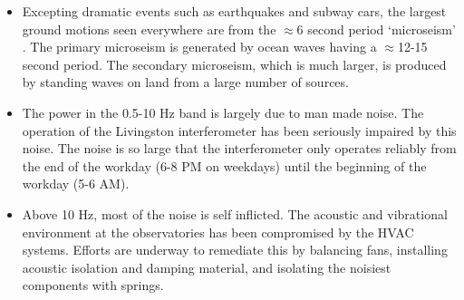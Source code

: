 \begin{itemize}
\item Excepting dramatic events such as earthquakes and subway cars, the largest
      ground motions seen everywhere are from the $\approx$6 second period 
      `microseism' \cite{useism}.
      The primary microseism is generated by ocean waves having a $\approx$12-15 second
      period. The secondary microseism, which is much larger, is produced
      by standing waves on land from a large number of sources.

\item The power in the 0.5-10 Hz band is largely due to man made noise. 
      The operation of the Livingston interferometer has been
      seriously impaired by this noise. The noise is so large that the
      interferometer only operates reliably from the end of the workday
      (6-8 PM on weekdays) until the beginning of the workday (5-6 AM).

\item Above 10 Hz, most of the noise is self inflicted. The acoustic and 
      vibrational environment at the observatories has been compromised 
      by the HVAC systems. 
      Efforts are underway to remediate this by balancing fans, installing 
      acoustic isolation and damping material, and isolating the noisiest components 
      with springs.
\end{itemize}


